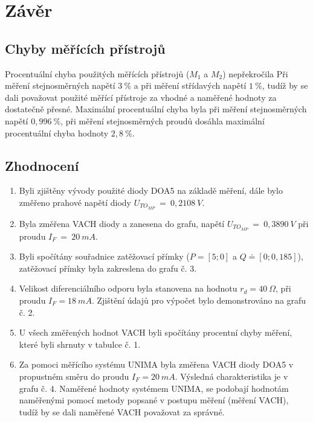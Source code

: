 \section{Závěr}
  
  
  \subsection{Chyby měřících přístrojů}
    \indent\indent
    Procentuální chyba použitých měřících přístrojů ($M_1$ a $M_2$) nepřekročila Při měření stejnosměrných napětí $3~\%$ a při měření střídavých napětí $1~\%$, tudíž by se dali považovat použité měřící přístroje za vhodné a naměřené hodnoty za dostatečně přesné. Maximální procentuální chyba byla při měření stejnosměrných napětí $0,996~\%$, při měření stejnosměrných proudů  dosáhla maximální procentuální chyba hodnoty $2,8~\%$.
  
  \subsection{Zhodnocení}
    \begin{enumerate}
      \item
        Byli zjištěny vývody použité diody DOA5 na základě měření, dále bylo změřeno prahové napětí diody $U_{TO_{MP}}~=~0,2108~V$.
      \item
        Byla změřena VACH diody a zanesena do grafu, napětí $U_{TO_{MP}}~=~0,3890~V$ při proudu $I_F~=~20~mA$.
      \item
      	Byli spočítány souřadnice zatěžovací přímky ($P = [5; 0]$ a $Q \doteq [0; 0,185]$), zatěžovací přímky byla zakreslena do grafu č. 3.
      \item
        Velikost diferenciálního odporu byla stanovena na hodnotu $r_d = 40~\Omega$, při proudu $I_F = 18~mA$. Zjištění údajů pro výpočet bylo demonstrováno na grafu č. 2.
      \item
        U všech změřených hodnot VACH byli spočítány procentní chyby měření, které byli shrnuty v tabulce č. 1.
      \item
      	Za pomoci měřícího systému UNIMA byla změřena VACH diody DOA5 v propustném směru do proudu $I_F = 20~mA$. Výsledná charakteristika je v grafu č. 4. Naměřené hodnoty systémem UNIMA, se podobají hodnotám naměřenými pomocí metody popsané v postupu měření (měření VACH), tudíž by se dali naměřené VACH považovat za správné.
    \end{enumerate}
